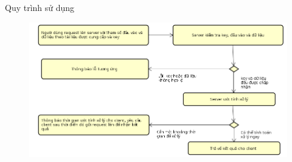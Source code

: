\documentclass{beamer}
\begin{document}
\begin{frame}{Quy trình sử dụng}
\begin{center}
\begin{figure}
\includegraphics[scale=0.4]{sudung.png}
\end{figure}
\end{center}
\end{frame}
\end{document}
